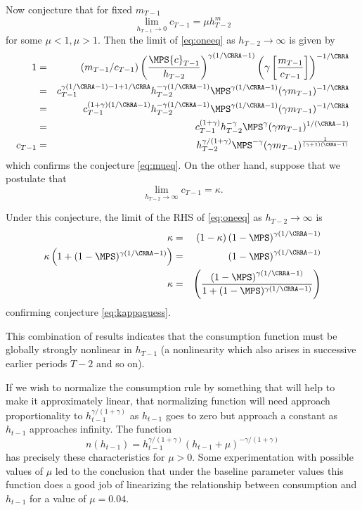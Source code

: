 \documentclass[titlepage]{\econtex}
\begin{document}
{Now conjecture that for fixed ${m}_{T-1}$
\begin{equation}
\lim_{h_{T-1} \rightarrow 0} {c}_{T-1} = \mu h_{T-2}^{m}
\label{eq:mueq}
\end{equation}
for some $\mu<1, \mu>1$.  Then the limit of \eqref{eq:oneeq} as $h_{T-2}
\rightarrow \infty$ is given by
\begin{eqnarray*}
        1 & = & ({m}_{T-1}/{c}_{T-1})\left(\frac{\MPS
        {c}_{T-1}}{h_{T-2}}\right)^{\gamma(1/\CRRA-1)}\left(\gamma
        \left[\frac{{m}_{T-1}}{{c}_{T-1}}\right]\right)^{-1/\CRRA}
\\    & = &
{c}_{T-1}^{\gamma(1/\CRRA-1)-1+1/\CRRA}h_{T-2}^{-\gamma(1/\CRRA-1)}\MPS^{\gamma(1/\CRRA-1)}(\gamma {m}_{T-1})^{-1/\CRRA}
\\    & = &
{c}_{T-1}^{(1+\gamma)(1/\CRRA-1)}h_{T-2}^{-\gamma(1/\CRRA-1)}\MPS^{\gamma(1/\CRRA-1)}(\gamma {m}_{T-1})^{-1/\CRRA}
\\    & = &
{c}_{T-1}^{(1+\gamma)}h_{T-2}^{-\gamma}\MPS^{\gamma}(\gamma {m}_{T-1})^{1/(\CRRA-1)}
\\ {c}_{T-1}   & = & h_{T-2}^{\gamma/(1+\gamma)}\MPS^{-\gamma}(\gamma
{m}_{T-1})^{\frac{1}{(\gamma+1)(\CRRA-1)}}
\end{eqnarray*}
which confirms the conjecture \eqref{eq:mueq}.  On the other hand,
suppose that we postulate that
\begin{equation}
\lim_{h_{T-2} \rightarrow \infty} {c}_{T-1} = \kappa.
\label{eq:kappaguess}
\end{equation}

Under this conjecture, the limit of the RHS of \eqref{eq:oneeq} as
$h_{T-2} \rightarrow \infty$ is
\begin{eqnarray*}
        \kappa & = &
        (1-\kappa)\left(1-\MPS\right)^{\gamma(1/\CRRA-1)}
\\      \kappa\left(1+(1-\MPS)^{\gamma(1/\CRRA-1)}\right) & = & \left(1-\MPS\right)^{\gamma(1/\CRRA-1)}
\\      \kappa & = &
        \left(\frac{\left(1-\MPS\right)^{\gamma(1/\CRRA-1)}}
        {1+(1-\MPS)^{\gamma(1/\CRRA-1)}}\right)
\end{eqnarray*}
confirming conjecture \eqref{eq:kappaguess}.

This combination of results indicates that the consumption function
must be globally strongly nonlinear in $h_{T-1}$ (a nonlinearity which
also arises in successive earlier periods $T-2$ and so on).

If we wish to normalize the consumption rule by something that will
help to make it approximately linear, that normalizing function will
need approach proportionality to $h_{t-1}^{\gamma/(1+\gamma)}$ as
$h_{t-1}$ goes to zero but approach a constant as $h_{t-1}$ approaches
infinity.  The function
\begin{equation}
        n(h_{t-1}) =
        h_{t-1}^{\gamma/(1+\gamma)}(h_{t-1}+\mu)^{-\gamma/(1+\gamma)}
\end{equation}
has precisely these characteristics for $\mu>0$.  Some
experimentation with possible values of $\mu$ led to the conclusion
that under the baseline parameter values this function does a good job
of linearizing the relationship between consumption and $h_{t-1}$ for
a value of $\mu = 0.04$.

}
\end{document}
